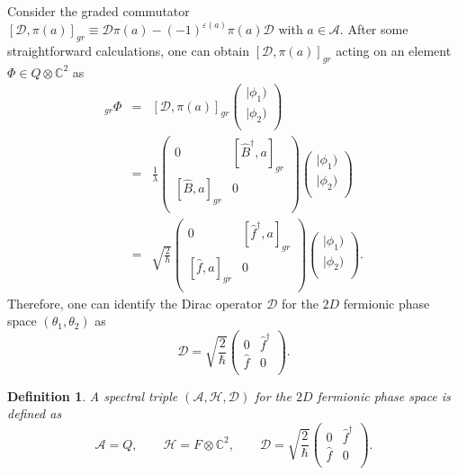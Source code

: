 \documentclass[a4paper,12pt]{article}
\newtheorem{definition}{Definition}
\begin{document}
Consider the graded commutator $[\mathcal{D},\pi(a)]_{gr}\equiv \mathcal{D}\pi(a)-(-1)^{\varepsilon(a)}\pi(a)\mathcal{D}$ with $a\in \mathcal{A}$.
After some straightforward calculations, one can obtain $[\mathcal{D},\pi(a)]_{gr}$ acting on an element $\Phi\in Q\otimes \mathds{C}^2$ as
\begin{eqnarray}
	[\mathcal{D},\pi(a)]_{gr}\Phi
	&=&[\mathcal{D},\pi(a)]_{gr}
	\left(
	\begin{array}{c}
		|\phi_1) \\
		|\phi_2) \\
	\end{array}
	\right)\nonumber\\
	&=&\frac{1}{\lambda}\left(
	\begin{array}{cc}
		0 & [\hat{B}^\dag,a]_{gr} \\{}
		[\hat{B},a]_{gr} & 0 \\
	\end{array}\right)\left(
	\begin{array}{c}
		\!|\phi_1) \\
		\!|\phi_2) \\
	\end{array}
	\!\right)\nonumber\\
	&=&\sqrt{\frac{2}{\hbar}}\left(
	\begin{array}{cc}
		0 & [\hat{f}^\dag,a]_{gr} \\{}
		[\hat{f},a]_{gr} & 0 \\
	\end{array}\right)\left(
	\begin{array}{c}
		\!|\phi_1) \\
		\!|\phi_2) \\
	\end{array}
	\!\right).
\end{eqnarray}
Therefore, one can identify the Dirac operator $\mathcal{D}$ for the $2D$ fermionic phase space $(\theta_1, \theta_2)$  as
\begin{equation}\label{do}
	\mathcal{D}=\sqrt{\frac{2}{\hbar}}\left(
	\begin{array}{cccc}
		0 & \hat{f}^\dag \\
		\hat{f} & 0 \\
	\end{array}\right).
\end{equation}
\begin{definition}
	A spectral triple $(\mathcal{A},\mathcal{H},\mathcal{D})$ for the $2D$ fermionic phase space is defined as
	\begin{equation}
		\mathcal{A}=Q,
		\qquad\mathcal{H}=F\otimes \mathds{C}^2,
		\qquad\mathcal{D}=\sqrt{\frac{2}{\hbar}}\left(
		\begin{array}{cccc}
			0 & \hat{f}^\dag \\
			\hat{f} & 0 \\
		\end{array}\right).
	\end{equation}
\end{definition}
\end{document}
